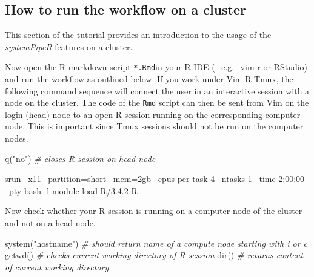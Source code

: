\documentclass[14pt,]{article}
\newcommand{\hlstr}[1]{\textcolor[rgb]{0.251,0.627,0.251}{#1}}%
\newcommand{\hlcom}[1]{\textcolor[rgb]{0.502,0.502,0.502}{\textit{#1}}}%
\newcommand{\hlstd}[1]{\textcolor[rgb]{0.251,0.251,0.251}{#1}}%
\newcommand{\hlkwd}[1]{\textcolor[rgb]{0.878,0.439,0.125}{#1}}%
\newenvironment{Shaded}{\begin{myshaded}}{\end{myshaded}}
\newcommand{\KeywordTok}[1]{\hlkwd{#1}}
\newcommand{\StringTok}[1]{\hlstr{#1}}
\newcommand{\CommentTok}[1]{\hlcom{#1}}
\newcommand{\ExtensionTok}[1]{{#1}}
\newcommand{\NormalTok}[1]{\hlstd{#1}}
\begin{document}
\hypertarget{how-to-run-the-workflow-on-a-cluster}{%
\subsection{How to run the workflow on a cluster}\label{how-to-run-the-workflow-on-a-cluster}}

This section of the tutorial provides an introduction to the usage of the \emph{systemPipeR} features on a cluster.

Now open the R markdown script \texttt{*.Rmd}in your R IDE (\_e.g.\_vim-r or RStudio) and run the workflow as outlined below. If you work under Vim-R-Tmux, the following command sequence will connect the user in an
interactive session with a node on the cluster. The code of the \texttt{Rmd}
script can then be sent from Vim on the login (head) node to an open R session running
on the corresponding computer node. This is important since Tmux sessions
should not be run on the computer nodes.

\begin{Shaded}
\begin{Highlighting}[]
\KeywordTok{q}\NormalTok{(}\StringTok{"no"}\NormalTok{)  }\CommentTok{# closes R session on head node}
\end{Highlighting}
\end{Shaded}

\begin{Shaded}
\begin{Highlighting}[]
\ExtensionTok{srun}\NormalTok{ --x11 --partition=short --mem=2gb --cpus-per-task 4 --ntasks 1 --time 2:00:00 --pty bash -l}
\ExtensionTok{module}\NormalTok{ load R/3.4.2}
\ExtensionTok{R}
\end{Highlighting}
\end{Shaded}

Now check whether your R session is running on a computer node of the cluster and not on a head node.

\begin{Shaded}
\begin{Highlighting}[]
\KeywordTok{system}\NormalTok{(}\StringTok{"hostname"}\NormalTok{)  }\CommentTok{# should return name of a compute node starting with i or c }
\KeywordTok{getwd}\NormalTok{()  }\CommentTok{# checks current working directory of R session}
\KeywordTok{dir}\NormalTok{()  }\CommentTok{# returns content of current working directory}
\end{Highlighting}
\end{Shaded}
\end{document}
